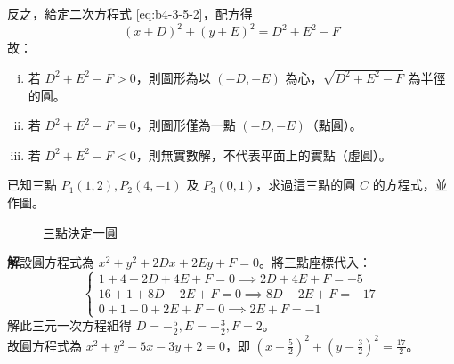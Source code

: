 反之，給定二次方程式 \eqref{eq:b4-3-5-2}，配方得
\[ (x+D)^2 + (y+E)^2 = D^2 + E^2 - F \]
故：
\begin{enumerate}[(i)]
  \item 若 $D^2 + E^2 - F > 0$，則圖形為以 $(-D, -E)$ 為心，$\sqrt{D^2 + E^2 - F}$ 為半徑的圓。
  \item 若 $D^2 + E^2 - F = 0$，則圖形僅為一點 $(-D, -E)$（點圓）。
  \item 若 $D^2 + E^2 - F < 0$，則無實數解，不代表平面上的實點（虛圓）。
\end{enumerate}

\begin{example}
已知三點 $P_1(1,2), P_2(4,-1)$ 及 $P_3(0,1)$，求過這三點的圓 $C$ 的方程式，並作圖。

\begin{figure}[htbp]
\centering
{}
\caption{三點決定一圓}
\label{fig:b4-3-33}
\end{figure}

\textbf{解}\quad 設圓方程式為 $x^2 + y^2 + 2Dx + 2Ey + F = 0$。將三點座標代入：
\[
\begin{cases}
1 + 4 + 2D + 4E + F = 0 \implies 2D + 4E + F = -5 \\
16 + 1 + 8D - 2E + F = 0 \implies 8D - 2E + F = -17 \\
0 + 1 + 0 + 2E + F = 0 \implies 2E + F = -1
\end{cases}
\]
解此三元一次方程組得 $D = -\frac{5}{2}, E = -\frac{3}{2}, F = 2$。\\
故圓方程式為 $x^2 + y^2 - 5x - 3y + 2 = 0$，即 $(x - \frac{5}{2})^2 + (y - \frac{3}{2})^2 = \frac{17}{2}$。
\end{example}

